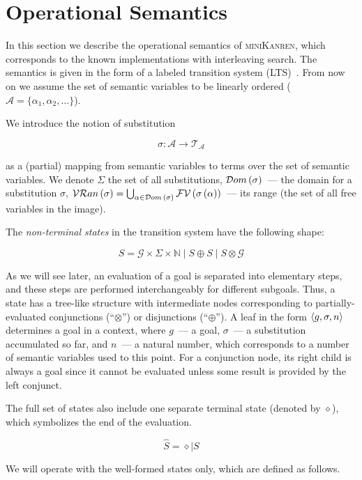\section{Operational Semantics}
\label{operational}

In this section we describe the operational semantics of \textsc{miniKanren}, which corresponds to the known
implementations with interleaving search. The semantics is given in the form of a labeled transition system (LTS)~\cite{LTS}. From now on we
assume the set of semantic variables to be linearly ordered ($\mathcal{A}=\{\alpha_1,\alpha_2,\dots\}$).

We introduce the notion of substitution

\[
  \sigma : \mathcal{A}\to\mathcal{T_A}
\]

as a (partial) mapping from semantic variables to terms over the set of semantic variables. We denote $\Sigma$ the
set of all substitutions, $\mathcal{D}om\,({\sigma})$~--- the domain for a substitution $\sigma$,
$\mathcal{VR}an\,({\sigma})=\bigcup_{\alpha\in\mathcal{D}om\,(\sigma)}\mathcal{FV}\,({\sigma\,(\alpha)})$~--- its range (the set of all free variables in the image).

The \emph{non-terminal states} in the transition system have the following shape:

\[
S = \mathcal{G}\times\Sigma\times\mathbb{N}\mid S\oplus S \mid S \otimes \mathcal{G}
\]

As we will see later, an evaluation of a goal is separated into elementary steps, and these steps are performed interchangeably for different subgoals. 
Thus, a state has a tree-like structure with intermediate nodes corresponding to partially-evaluated conjunctions (``$\otimes$'') or
disjunctions (``$\oplus$''). A leaf in the form $\left<{g, \sigma, n}\right>$ determines a goal in a context, where $g$~--- a goal, $\sigma$~--- a substitution accumulated so far,
and $n$~--- a natural number, which corresponds to a number of semantic variables used to this point. For a conjunction node, its right child is always a goal since
it cannot be evaluated unless some result is provided by the left conjunct.

The full set of states also include one separate terminal state (denoted by $\diamond$), which symbolizes the end of the evaluation.

\[
\hat{S} = \diamond \mid S
\]

We will operate with the well-formed states only, which are defined as follows.

